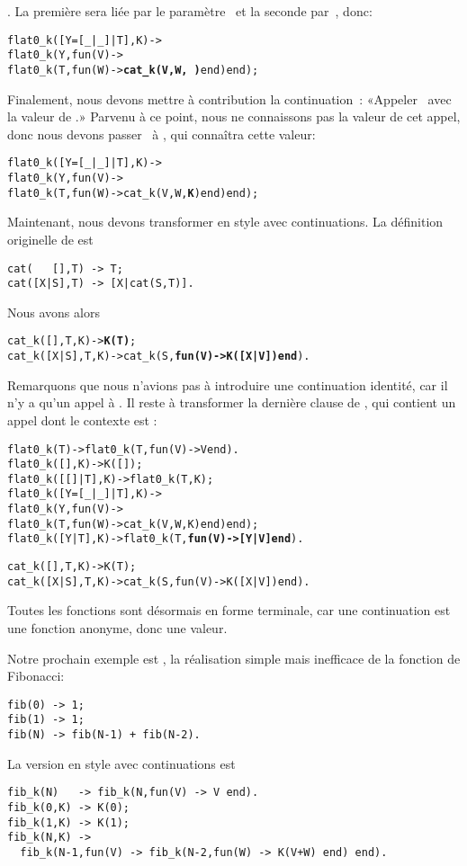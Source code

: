 . La première sera liée par le paramètre~
et la seconde par~, donc:
\begin{alltt}
flat0\_k([Y=[\_|\_]|T],K) ->
  flat0\_k(Y,fun(V) ->
              flat0\_k(T,fun(W) -> \textbf{cat\_k(V,W,\,)} end) end);
\end{alltt}
Finalement, nous devons mettre à contribution la
continuation~: «Appeler~ avec la valeur de
.» Parvenu à ce point, nous ne
connaissons pas la valeur de cet appel, donc nous devons
passer~ à , qui connaîtra cette valeur:
\begin{alltt}
flat0\_k([Y=[\_|\_]|T],K) ->
  flat0\_k(Y,fun(V) ->
              flat0\_k(T,fun(W) -> cat\_k(V,W,\textbf{K}) end) end);
\end{alltt}
Maintenant, nous devons transformer  en style avec
continuations. La définition originelle de  est
\begin{verbatim}
cat(   [],T) -> T;
cat([X|S],T) -> [X|cat(S,T)].
\end{verbatim}
Nous avons alors
\begin{alltt}
cat\_k(   [],T,K) -> \textbf{K(T)};
cat\_k([X|S],T,K) -> cat\_k(S,\textbf{fun(V) -> K([X|V]) end}).
\end{alltt}
Remarquons que nous n'avions pas à introduire une continuation
identité, car il n'y a qu'un appel à . Il reste à
transformer la dernière clause de , qui contient un
appel dont le contexte est \erlcode{[Y|\textvisiblespace]}:
\begin{alltt}
flat0\_k(T)             -> flat0\_k(T,fun(V) -> V end).
flat0\_k(         [],K) -> K([]);
flat0\_k(     [[]|T],K) -> flat0\_k(T,K);
flat0\_k([Y=[_|_]|T],K) ->
  flat0\_k(Y,fun(V) ->
              flat0\_k(T,fun(W) -> cat\_k(V,W,K) end) end);
flat0\_k(      [Y|T],K) -> flat0\_k(T,\textbf{fun(V) -> [Y|V] end}).

cat\_k(   [],T,K) -> K(T);
cat\_k([X|S],T,K) -> cat\_k(S,fun(V) -> K([X|V]) end).
\end{alltt}
Toutes les fonctions sont désormais en forme terminale, car une
continuation est une fonction anonyme, donc une valeur.

Notre prochain exemple est , la réalisation simple mais
inefficace de la fonction de Fibonacci:
\begin{verbatim}
fib(0) -> 1;
fib(1) -> 1;
fib(N) -> fib(N-1) + fib(N-2).
\end{verbatim}
La version en style avec continuations est
\begin{verbatim}
fib_k(N)   -> fib_k(N,fun(V) -> V end).
fib_k(0,K) -> K(0);
fib_k(1,K) -> K(1);
fib_k(N,K) ->
  fib_k(N-1,fun(V) -> fib_k(N-2,fun(W) -> K(V+W) end) end).
\end{verbatim}

